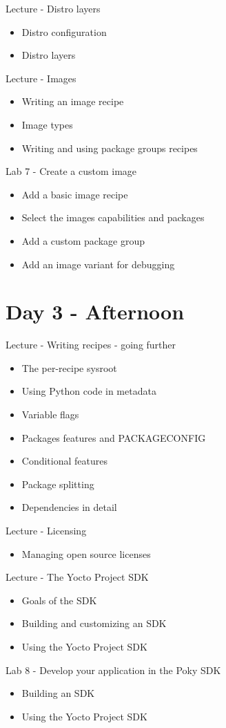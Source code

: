 \documentclass[a4paper,12pt,obeyspaces,spaces,hyphens]{article}
\begin{document}
\feagendaonecolumn
{Lecture - Distro layers}
{
  \begin{itemize}
  \item Distro configuration
  \item Distro layers
  \end{itemize}
}

\feagendatwocolumn
{Lecture - Images}
{
  \begin{itemize}
  \item Writing an image recipe
  \item Image types
  \item Writing and using package groups recipes
  \end{itemize}
}
{Lab 7 - Create a custom image}
{
  \begin{itemize}
  \item Add a basic image recipe
  \item Select the images capabilities and packages
  \item Add a custom package group
  \item Add an image variant for debugging
  \end{itemize}
}

\section{Day 3 - Afternoon}

\feagendatwocolumn
{Lecture - Writing recipes - going further}
{
  \begin{itemize}
  \item The per-recipe sysroot
  \item Using Python code in metadata
  \item Variable flags
  \item Packages features and PACKAGECONFIG
  \item Conditional features
  \item Package splitting
  \item Dependencies in detail
  \end{itemize}
}
{Lecture - Licensing}
{
  \begin{itemize}
  \item Managing open source licenses
  \end{itemize}
}

\feagendatwocolumn
{Lecture - The Yocto Project SDK}
{
  \begin{itemize}
  \item Goals of the SDK
  \item Building and customizing an SDK
  \item Using the Yocto Project SDK
  \end{itemize}
}
{Lab 8 - Develop your application in the Poky SDK}
{
  \begin{itemize}
  \item Building an SDK
  \item Using the Yocto Project SDK
  \end{itemize}
}
\end{document}
